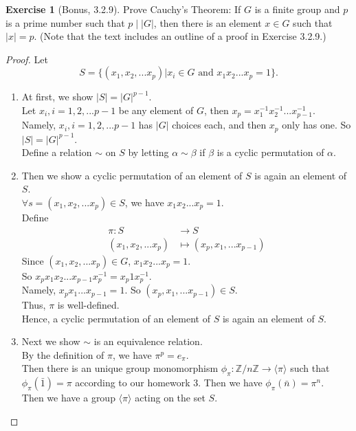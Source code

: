 \documentclass[14pt]{amsart}
\newcommand{\bbz}{\mathbb{Z}}
\theoremstyle{plain}
\theoremstyle{definition}
\newtheorem{exer}[lem]{Exercise}
\begin{document}
\begin{exer}[Bonus, 3.2.9]
Prove Cauchy's Theorem: If $G$ is a finite group and $p$ is a prime number such that $p\mid |G|$, then there is an element $x\in G$ such that $|x|=p$.
(Note that the text includes an outline of a proof in Exercise 3.2.9.)
\end{exer}
\begin{proof}
	Let
	\[S=\{ (x_1,x_2,...x_p)| x_i \in G \text{ and } x_1x_2...x_p =1\}.\]
	\begin{enumerate}
	  \item
		At first, we show $|S|= |G|^{p-1}$.\\
 	    Let $x_i, i = 1,2,...p-1$ be any element of $G$, then $x_p = x_1^{-1}x_2^{-1}...x_{p-1}^{-1}$. \\
		Namely, $x_i,i = 1,2,...p-1$ has $|G|$ choices each, and then $x_p$ only has one. So $|S| = |G|^{p-1}$.	\\
		Define a relation $\sim $ on $S$ by letting $\alpha \sim \beta$ if $\beta$ is a cyclic permutation of $\alpha$.
	  \item
	  Then we show a cyclic permutation of an element of $S$ is again an element of $S$.\\
  	$\forall s = (x_1,x_2,...x_p) \in S$, we have $x_1x_2...x_p = 1$.\\
	Define 
	\begin{align*}
		\pi: S &\to S	\\
		(x_1,x_2,...x_p) &\mapsto (x_p,x_1,...x_{p-1})	
	\end{align*}
	Since $(x_1,x_2,...x_p) \in G$, $x_1x_2...x_p =1$.\\
	So $x_px_1x_2...x_{p-1}x_p^{-1} = x_p1 x_p^{-1}$.\\
	Namely, $x_px_1...x_{p-1} =1$. So $(x_p,x_1,...x_{p-1}) \in S$.\\
	Thus, $\pi$ is well-defined.\\
	Hence, a cyclic permutation of an element of $S$ is again an element of $S$.
	  \item
		Next we show $\sim $ is an equivalence relation.\\
		By the definition of $\pi$, we have ${\pi}^p= e_{\pi}$.\\
 	   	Then there is an unique group monomorphism $\phi_{\pi}: \bbz/n\bbz \to \langle\pi\rangle$ such that $\phi_{\pi}(\bar{1}) = \pi$ according to our homework 3. Then we have $\phi_{\pi}(\bar{n}) = \pi^n$.\\
 	   	Then we have a group $\langle \pi \rangle$ acting on the set $S$.\\

\end{enumerate}
\end{proof}
\end{document}
